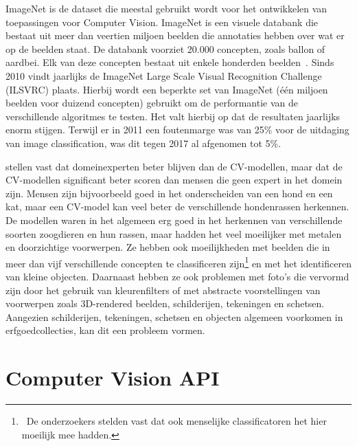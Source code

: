 ImageNet is de dataset die meestal gebruikt wordt voor het ontwikkelen van toepassingen voor Computer Vision. ImageNet is een visuele databank die bestaat uit meer dan veertien miljoen beelden die annotaties hebben over wat er op de beelden staat. De databank voorziet 20.000 concepten, zoals ballon of aardbei. Elk van deze concepten bestaat uit enkele honderden beelden~\autocites{WikiImageNet}{Brownlee2019a}. Sinds 2010 vindt jaarlijks de ImageNet Large Scale Visual Recognition Challenge (ILSVRC) plaats. Hierbij wordt een beperkte set van ImageNet (één miljoen beelden voor duizend concepten) gebruikt om de performantie van de verschillende algoritmes te testen. Het valt hierbij op dat de resultaten jaarlijks enorm stijgen. Terwijl er in 2011 een foutenmarge was van 25\% voor de uitdaging van image classification, was dit tegen 2017 al afgenomen tot 5\%. 

\textcite{Russakovsky2014} stellen vast dat domeinexperten beter blijven dan de CV-modellen, maar dat de CV-modellen significant beter scoren dan mensen die geen expert in het domein zijn. Mensen zijn bijvoorbeeld goed in het onderscheiden van een hond en een kat, maar een CV-model kan veel beter de verschillende hondenrassen herkennen. De modellen waren in het algemeen erg goed in het herkennen van verschillende soorten zoogdieren en hun rassen, maar hadden het veel moeilijker met metalen en doorzichtige voorwerpen. Ze hebben ook moeilijkheden met beelden die in meer dan vijf verschillende concepten te classificeren zijn\footnote{~De onderzoekers stelden vast dat ook menselijke classificatoren het hier moeilijk mee hadden.} en met het identificeren van kleine  objecten. Daarnaast hebben ze ook problemen met foto’s die vervormd zijn door het gebruik van kleurenfilters  of met abstracte voorstellingen van voorwerpen zoals 3D-rendered beelden, schilderijen, tekeningen en schetsen. Aangezien schilderijen, tekeningen, schetsen en objecten algemeen voorkomen in erfgoedcollecties, kan dit een probleem vormen.

\section{Computer Vision API}
\label{sec:CV-API}


